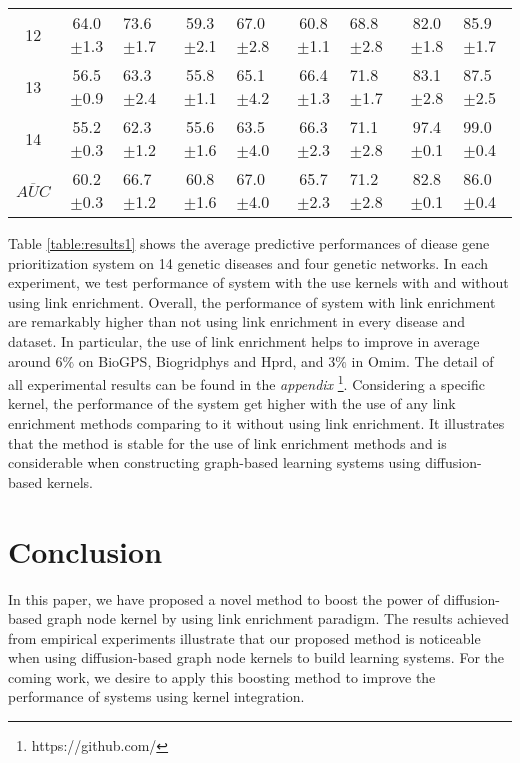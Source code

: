 \documentclass[runningheads,a4paper]{llncs}
\begin{document}
{\begin{table*}[!htbp]
\begin{tabular}{|c|c|g|c|g|c|g|c|g|}
12 & 64.0$\pm$1.3 & 73.6$\pm$1.7 & 59.3$\pm$2.1 & 67.0$\pm$2.8 & 60.8$\pm$1.1 & 68.8$\pm$2.8 & 82.0$\pm$1.8 & 85.9$\pm$1.7 \\
13 & 56.5$\pm$0.9 & 63.3$\pm$2.4 & 55.8$\pm$1.1 & 65.1$\pm$4.2 & 66.4$\pm$1.3 & 71.8$\pm$1.7 & 83.1$\pm$2.8 & 87.5$\pm$2.5 \\
14 & 55.2$\pm$0.3 & 62.3$\pm$1.2 & 55.6$\pm$1.6 & 63.5$\pm$4.0 & 66.3$\pm$2.3 & 71.1$\pm$2.8 & 97.4$\pm$0.1 & 99.0$\pm$0.4 \\
\hline
$\overline{AUC}$ & 60.2$\pm$0.3 & 66.7$\pm$1.2 & 60.8$\pm$1.6 & 67.0$\pm$4.0 & 65.7$\pm$2.3 & 71.2$\pm$2.8 & 82.8$\pm$0.1 & 86.0$\pm$0.4 \\
\hline
\end{tabular}
\end{table*}
\newcommand{\squeezeup}{\vspace{-4mm}}
\squeezeup
Table \ref{table:results1} shows the average predictive performances of diease gene prioritization system on 14 genetic diseases and four genetic networks. In each experiment, we test performance of system with the use kernels with and without using link enrichment. Overall, the performance of system with link enrichment are remarkably higher than not using link enrichment in every disease and dataset. In particular, the use of link enrichment helps to improve in average around 6$\%$ on BioGPS, Biogridphys and Hprd, and 3$\%$ in Omim. The detail of all experimental results can be found in the \textit{appendix} \footnote{https://github.com/}. Considering a specific kernel, the performance of the system get higher with the use of any link enrichment methods comparing to it without using link enrichment. 
It illustrates that the method is stable for the use of link enrichment methods and is considerable when constructing graph-based learning systems using diffusion-based kernels.

\section{Conclusion}
\label{conclusion}
In this paper, we have proposed a novel method to boost the power of diffusion-based graph node kernel by using link enrichment paradigm. The results achieved from empirical experiments illustrate that our proposed method is noticeable when using diffusion-based graph node kernels to build learning systems. For the coming work, we desire to apply this boosting method to improve the performance of systems using kernel integration.


% 
% 

}
\end{document}
